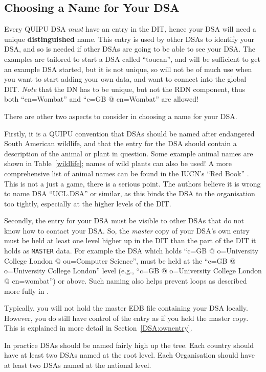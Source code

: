 \subsection {Choosing a Name for Your DSA}
\label{dsa:naming}
Every QUIPU DSA {\em must} have an entry in the DIT, hence your DSA will
need a unique {\bf distinguished} name.  This entry is used by other DSAs to
identify your DSA, and so is needed if other DSAs are going to be able
to see your DSA.  The examples are tailored to start a DSA called
``toucan'', and will be sufficient to get an example DSA started, but it
is not unique, so will not be of much use when you want to start
adding your own data, and want to connect into the global DIT.  
{\em Note} that the DN has to be unique, but not the RDN component, thus both
``cn=Wombat'' and ``c=GB @ cn=Wombat'' are allowed!

There are other two aspects to consider in choosing a name for your DSA.


Firstly, it is a QUIPU convention that DSAs should be named 
after endangered South
American wildlife, and that the entry for the DSA should contain a
description of the animal or plant in question.
Some example animal names are shown in Table~\ref{wildlife}; names of
wild plants can also be used!
A more comprehensive list of animal names 
can be found in the IUCN's ``Red Book''
\cite{IUCN.Mammal}.
This is not a just a game, there is a serious point.  The authors
believe it is wrong to name DSA ``UCL.DSA'' or similar, as this binds
the DSA to the organisation too tightly, especially at the higher
levels of the DIT.

Secondly, the entry for your DSA must be visible to other DSAs that do not know
how to contact your DSA.
So, the {\em master} copy of your DSA's own entry must be held at least one level higher up
in the DIT than the part of the DIT it holds as \verb"MASTER" data.
For example the DSA which holds
``c=GB @ o=University College London @ ou=Computer Science'', 
must be held at the
``c=GB @ o=University College London'' level 
(e.g., ``c=GB @ o=University College London @ cn=wombat'') or above.
Such naming also helps prevent loops as described more fully in
\cite{QUIPU.Design}.

Typically, you will not hold the master EDB file containing your DSA
locally.  However, you do still have control of the entry as if you
held the master copy.  This is explained in more detail in
Section~\ref{DSA:ownentry}. 

In practice DSAs should be named fairly high up the tree.
Each country should have at least two DSAs named at the root level.
Each Organisation should have at least two DSAs named at the national level.

